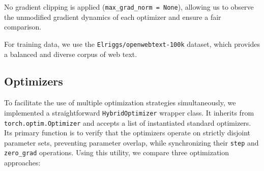 \documentclass[11pt,a4paper]{article}
\begin{document}
No gradient clipping is applied (\texttt{max\_grad\_norm = None}),
allowing us to observe the unmodified gradient dynamics of each optimizer
and ensure a fair comparison.

For training data, we use the \texttt{Elriggs/openwebtext-100k} dataset,
which provides a balanced and diverse corpus of web text.


\subsection{Optimizers}

To facilitate the use of multiple optimization strategies simultaneously,
we implemented a straightforward \texttt{HybridOptimizer} wrapper class. It
inherits from \texttt{torch.optim.Optimizer} and accepts a list of instantiated
standard optimizers. Its primary function is to verify that the optimizers
operate on strictly disjoint parameter sets, preventing parameter overlap,
while synchronizing their \texttt{step} and \texttt{zero\_grad} operations.
Using this utility, we compare three optimization approaches:
\end{document}
